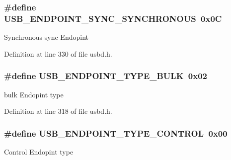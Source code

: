 \subsubsection[{\texorpdfstring{U\+S\+B\+\_\+\+E\+N\+D\+P\+O\+I\+N\+T\+\_\+\+S\+Y\+N\+C\+\_\+\+S\+Y\+N\+C\+H\+R\+O\+N\+O\+US}{USB_ENDPOINT_SYNC_SYNCHRONOUS}}]{\setlength{\rightskip}{0pt plus 5cm}\#define U\+S\+B\+\_\+\+E\+N\+D\+P\+O\+I\+N\+T\+\_\+\+S\+Y\+N\+C\+\_\+\+S\+Y\+N\+C\+H\+R\+O\+N\+O\+US~0x0C}\hypertarget{group__USBD__Core_ga0309c68623fb48fdc621f15dabc579f2}{}\label{group__USBD__Core_ga0309c68623fb48fdc621f15dabc579f2}
Synchronous sync Endopint 

Definition at line 330 of file usbd.\+h.

\subsubsection[{\texorpdfstring{U\+S\+B\+\_\+\+E\+N\+D\+P\+O\+I\+N\+T\+\_\+\+T\+Y\+P\+E\+\_\+\+B\+U\+LK}{USB_ENDPOINT_TYPE_BULK}}]{\setlength{\rightskip}{0pt plus 5cm}\#define U\+S\+B\+\_\+\+E\+N\+D\+P\+O\+I\+N\+T\+\_\+\+T\+Y\+P\+E\+\_\+\+B\+U\+LK~0x02}\hypertarget{group__USBD__Core_gaf4bac84d4576dc8f74f39dc75749e3dc}{}\label{group__USBD__Core_gaf4bac84d4576dc8f74f39dc75749e3dc}
bulk Endopint type 

Definition at line 318 of file usbd.\+h.

\subsubsection[{\texorpdfstring{U\+S\+B\+\_\+\+E\+N\+D\+P\+O\+I\+N\+T\+\_\+\+T\+Y\+P\+E\+\_\+\+C\+O\+N\+T\+R\+OL}{USB_ENDPOINT_TYPE_CONTROL}}]{\setlength{\rightskip}{0pt plus 5cm}\#define U\+S\+B\+\_\+\+E\+N\+D\+P\+O\+I\+N\+T\+\_\+\+T\+Y\+P\+E\+\_\+\+C\+O\+N\+T\+R\+OL~0x00}\hypertarget{group__USBD__Core_ga6a51ed22b06e5ca0f76a35b6bac8d73a}{}\label{group__USBD__Core_ga6a51ed22b06e5ca0f76a35b6bac8d73a}
Control Endopint type 

